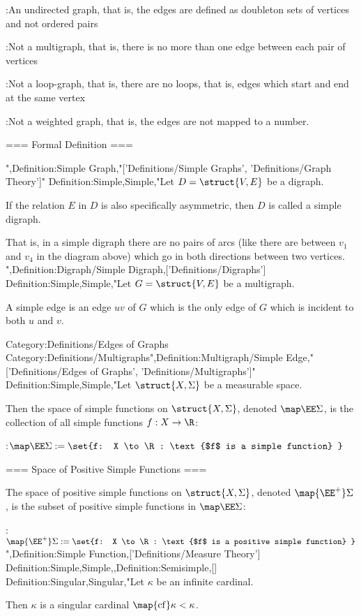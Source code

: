 :An undirected graph, that is, the edges are defined as doubleton sets of vertices and not ordered pairs

:Not a multigraph, that is, there is no more than one edge between each pair of vertices

:Not a loop-graph, that is, there are no loops, that is, edges which start and end at the same vertex

:Not a weighted graph, that is, the edges are not mapped to a number.


=== Formal Definition ===

",Definition:Simple Graph,"['Definitions/Simple Graphs', 'Definitions/Graph Theory']"
Definition:Simple,Simple,"Let $D = \struct {V, E}$ be a digraph.

If the relation $E$ in $D$ is also specifically asymmetric, then $D$ is called a simple digraph.

That is, in a simple digraph there are no pairs of arcs (like there are between $v_1$ and $v_4$ in the diagram above) which go in both directions between two vertices.
",Definition:Digraph/Simple Digraph,['Definitions/Digraphs']
Definition:Simple,Simple,"Let $G = \struct {V, E}$ be a multigraph.


A simple edge is an edge $u v$ of $G$ which is the only edge of $G$ which is incident to both $u$ and $v$.


Category:Definitions/Edges of Graphs
Category:Definitions/Multigraphs",Definition:Multigraph/Simple Edge,"['Definitions/Edges of Graphs', 'Definitions/Multigraphs']"
Definition:Simple,Simple,"Let $\struct {X, \Sigma}$ be a measurable space.

Then the space of simple functions on $\struct {X, \Sigma}$, denoted $\map \EE \Sigma$, is the collection of all simple functions $f: X \to \R$:

:$\map \EE \Sigma := \set {f: X \to \R: \text{$f$ is a simple function} }$


=== Space of Positive Simple Functions ===

The space of positive simple functions on $\struct {X, \Sigma}$, denoted $\map {\EE^+} \Sigma$, is the subset of positive simple functions in $\map \EE \Sigma$:

:$\map {\EE^+} \Sigma := \set {f: X \to \R: \text {$f$ is a positive simple function} }$
",Definition:Simple Function,['Definitions/Measure Theory']
Definition:Simple,Simple,,Definition:Semisimple,[]
Definition:Singular,Singular,"Let $\kappa$ be an infinite cardinal.


Then $\kappa$ is a singular cardinal  $\map {\mathrm {cf} } \kappa < \kappa$.

